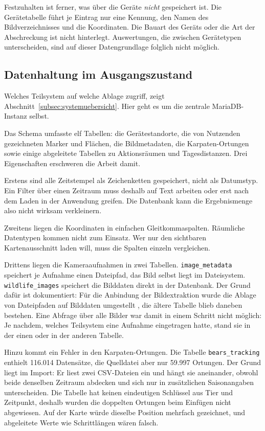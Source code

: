 \documentclass[12pt,a4paper]{report}
\begin{document}
Festzuhalten ist ferner, was über die Geräte \emph{nicht} gespeichert ist. Die Gerätetabelle
führt je Eintrag nur eine Kennung, den Namen des Bildverzeichnisses und die Koordinaten.
Die Bauart des Geräts oder die Art der Abschreckung ist nicht hinterlegt. Auswertungen, die
zwischen Gerätetypen unterscheiden, sind auf dieser Datengrundlage folglich nicht möglich.

\subsection{Datenhaltung im Ausgangszustand}
\label{subsec:datenhaltung}

Welches Teilsystem auf welche Ablage zugriff, zeigt Abschnitt~\ref{subsec:systemuebersicht}.
Hier geht es um die zentrale MariaDB-Instanz selbst.

Das Schema umfasste elf Tabellen: die Gerätestandorte, die von Nutzenden gezeichneten Marker
und Flächen, die Bildmetadaten, die Karpaten-Ortungen sowie einige abgeleitete Tabellen zu
Aktionsräumen und Tagesdistanzen. Drei Eigenschaften erschweren die Arbeit damit.

Erstens sind alle Zeitstempel als Zeichenketten gespeichert, nicht als Datumstyp. Ein Filter
über einen Zeitraum muss deshalb auf Text arbeiten oder erst nach dem Laden in der Anwendung
greifen. Die Datenbank kann die Ergebnismenge also nicht wirksam verkleinern.

Zweitens liegen die Koordinaten in einfachen Gleitkommaspalten. Räumliche Datentypen kommen
nicht zum Einsatz. Wer nur den sichtbaren Kartenausschnitt laden will, muss die Spalten
einzeln vergleichen.

Drittens liegen die Kameraaufnahmen in zwei Tabellen. \texttt{image\_metadata} speichert je
Aufnahme einen Dateipfad, das Bild selbst liegt im Dateisystem. \texttt{wildlife\_images}
speichert die Bilddaten direkt in der Datenbank. Der Grund dafür ist dokumentiert: Für die
Anbindung der Bildextraktion wurde die Ablage von Dateipfaden auf Bilddaten umgestellt
\cite[S.~21]{LelchatBA}, die ältere Tabelle blieb daneben bestehen. Eine Abfrage über alle
Bilder war damit in einem Schritt nicht möglich: Je nachdem, welches Teilsystem eine
Aufnahme eingetragen hatte, stand sie in der einen oder in der anderen Tabelle.

Hinzu kommt ein Fehler in den Karpaten-Ortungen. Die Tabelle \texttt{bears\_tracking}
enthielt 116.014 Datensätze, die Quelldatei aber nur 59.997 Ortungen. Der Grund liegt im
Import: Er liest zwei CSV-Dateien ein und hängt sie aneinander, obwohl beide denselben
Zeitraum abdecken und sich nur in zusätzlichen Saisonangaben unterscheiden. Die Tabelle hat
keinen eindeutigen Schlüssel aus Tier und Zeitpunkt, deshalb wurden die doppelten Ortungen
beim Einfügen nicht abgewiesen. Auf der Karte würde dieselbe Position mehrfach gezeichnet,
und abgeleitete Werte wie Schrittlängen wären falsch.
\end{document}
